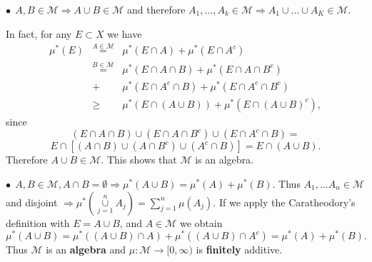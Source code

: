 \documentclass[12pt]{report}
\begin{document}
\smallskip
\noindent
$\bullet \ \ A, B \in \mathcal{M} \Longrightarrow A \cup B \in \mathcal{M}$
and therefore $A_1, \dots, A_k \in \mathcal{M} \Longrightarrow A_1 \cup
\dots \cup A_K \in \mathcal{M}$.

\smallskip
\noindent
 In fact, for any $E \subset X$ we have
\begin{eqnarray*}
\mu^* (E) &\overset{A \in \mathcal{M}}{=}&  \mu^*(E \cap A) + \mu^*(E
\cap A^c)
\\
&\overset{ B \in \mathcal{M}}{=}& \mu^* (E \cap A \cap B) + \mu^* (E
\cap A \cap B^c)\\ 
&+& \mu^*(E \cap A^c \cap B) + \mu^* (E \cap A^c \cap
B^c)\\
&\ge & \mu^*(E \cap (A \cup B)) + \mu^* (E \cap (A \cup B)^c),
\end{eqnarray*} 
since 
$$ (E \cap A \cap B)\cup (E \cap A \cap B^c) \cup (E \cap
A^c \cap B) =$$
$$ E \cap [(A \cap B) \cup (A \cap B^c) \cup (A^c \cap B)]
=E \cap (A \cup B).
$$
Therefore $A \cup B \in \mathcal{M}$. This shows that
$\mathcal{M}$  is an algebra.


\smallskip
\noindent
$\bullet \ \ A, B \in \mathcal{M}, A \cap B = \emptyset \Longrightarrow 
\mu^* (A
\cup B) = \mu^*(A) + \mu^*(B).$  Thus $A_1, \dots A_n \in \mathcal{M}$ and
disjoint
$\Longrightarrow \mu^* \left (\overset{n}{\underset{j=1}{\cup}} 
A_j\right )=
\sum\limits^n_{j=1}
\mu(A_j)$.  If we apply the Caratheodory's definition with $E = A \cup B$,
and $A
\in
\mathcal{M}$ we obtain
\[
\mu^* (A \cup B) = \mu^*((A \cup B) \cap A) + \mu^*((A \cup B) \cap A^c)
= \mu^* (A) + \mu^* (B).
\] Thus $\mathcal{M}$ is an {\bf  algebra} and $\mu: \mathcal{M}
\longrightarrow [0,
\infty)$ is {\bf  finitely} additive.
\end{document}
